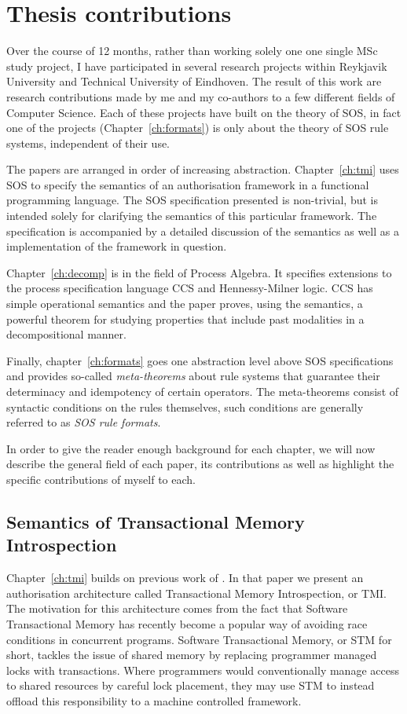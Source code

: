 \section{Thesis contributions}

Over the course of 12 months, rather than working solely one one single MSc study project,
I have participated in several research projects within
Reykjavik University and Technical University of Eindhoven. The result of this work
are research contributions made by me and my co-authors to a few different fields
of Computer Science. Each of these projects have built on the theory of SOS, in fact
one of the projects (Chapter~\ref{ch:formats}) is only about the theory of SOS rule
systems, independent of their use.

The papers are arranged in order of increasing abstraction. Chapter~\ref{ch:tmi} uses SOS
to specify the semantics of an authorisation framework in a functional programming language.
The SOS specification presented is non-trivial, but is intended solely for clarifying
the semantics of this particular framework. The specification is accompanied by a
detailed discussion of the semantics as well as a implementation of the framework
in question.

Chapter~\ref{ch:decomp} is in the field of Process Algebra. It specifies extensions
to the process specification language CCS and Hennessy-Milner logic. CCS has simple
operational semantics and the paper proves, using the semantics, a powerful theorem
for studying properties that include past modalities in a decompositional manner.

Finally, chapter~\ref{ch:formats} goes one abstraction level above SOS specifications
and provides so-called \emph{meta-theorems} about rule systems that guarantee their
determinacy and idempotency of certain operators. The meta-theorems consist of
syntactic conditions on the rules themselves, such conditions are generally referred
to as \emph{SOS rule formats}.

In order to give the reader enough background for each chapter, we will now describe
the general field of each paper, its contributions as well as highlight the specific
contributions of myself to each.


\subsection{Semantics of Transactional Memory Introspection}

Chapter~\ref{ch:tmi} builds on previous work of \cite{tmi}. In that paper we present
an authorisation architecture called Transactional Memory Introspection, or TMI.
The motivation for this architecture comes from the fact that Software Transactional
Memory has recently become a popular way of avoiding race conditions in concurrent
programs. Software Transactional Memory, or STM for short, tackles the issue of
shared memory by replacing programmer managed locks with transactions. Where programmers
would conventionally manage access to shared resources by careful lock placement,
they may use STM to instead offload this responsibility to a machine controlled
framework.

